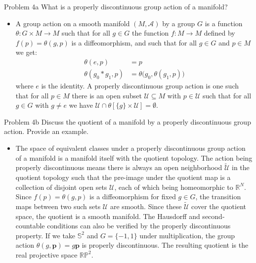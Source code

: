 \documentclass{beamer}
\begin{document}
    \begin{frame}{Problem 4a}
        What is a properly discontinuous group action of a manifold?
        \begin{itemize}
            \item A group action on a smooth manifold $(M,\mathcal{A})$ by a group
                $G$ is a function $\theta:G\times{M}\rightarrow{M}$ such that for
                all $g\in{G}$ the function $f:M\rightarrow{M}$ defined by
                $f(p)=\theta(g,p)$ is a diffeomorphism, and such that for all
                $g\in{G}$ and $p\in{M}$ we get:
            \begin{align}
                \theta(e,p)&=p\\
                \theta(g_{0}*g_{1},p)&=\theta\Big(g_{0},\theta(g_{1},p)\Big)
            \end{align}
            where $e$ is the identity. A properly discontinuous group action is
            one such that for all $p\in{M}$ there is an open subset
            $\mathcal{U}\subseteq{M}$ with $p\in\mathcal{U}$ such that for all
            $g\in{G}$ with $g\ne{e}$ we have
            $\mathcal{U}\cap\theta[\{g\}\times\mathcal{U}]=\emptyset$.
        \end{itemize}
    \end{frame}
    \begin{frame}{Problem 4b}
        Discuss the quotient of a manifold by a properly discontinuous group
        action. Provide an example.
        \begin{itemize}
            \item The space of equivalent classes under a properly discontinuous
                group action of a manifold is a manifold itself with the
                quotient topology. The action being properly discontinuous
                means there is always an open neighborhood
                $\tilde{\mathcal{U}}$ in the quotient topology such that
                the pre-image under the quotient map is a collection of disjoint
                open sets $\mathcal{U}$, each of which being homeomorphic to
                $\mathbb{R}^{N}$. Since $f(p)=\theta(g,p)$ is a diffeomorphism
                for fixed $g\in{G}$, the transition maps between two such sets
                $\mathcal{U}$ are smooth. Since these $\tilde{\mathcal{U}}$
                cover the quotient space, the quotient is a smooth manifold.
                The Hausdorff and second-countable conditions can also be
                verified by the properly discontinuous property. If we take
                $\mathbb{S}^{2}$ and $G=\{-1,1\}$ under multiplication, the
                group action $\theta(g,\mathbf{p})=g\mathbf{p}$ is properly
                discontinuous. The resulting quotient is the real projective
                space $\mathbb{RP}^{2}$.
        \end{itemize}
    \end{frame}
\end{document}
